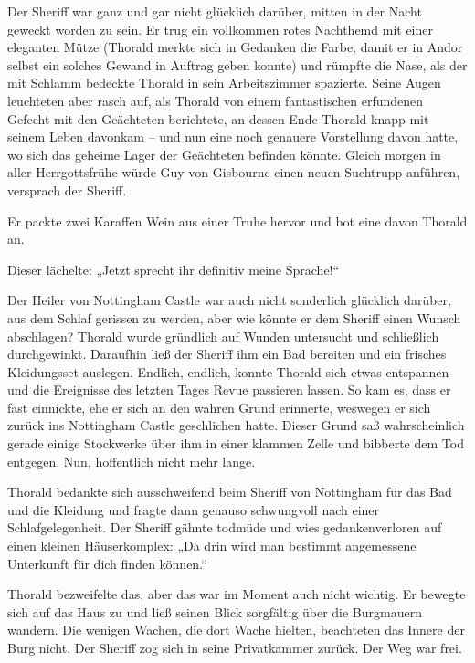 Der Sheriff war ganz und gar nicht glücklich darüber, mitten in der Nacht geweckt worden zu sein. Er trug ein vollkommen rotes Nachthemd mit einer eleganten Mütze (Thorald merkte sich in Gedanken die Farbe, damit er in Andor selbst ein solches Gewand in Auftrag geben konnte) und rümpfte die Nase, als der mit Schlamm bedeckte Thorald in sein Arbeitszimmer spazierte. Seine Augen leuchteten aber rasch auf, als Thorald von einem fantastischen erfundenen Gefecht mit den Geächteten berichtete, an dessen Ende Thorald knapp mit seinem Leben davonkam – und nun eine noch genauere Vorstellung davon hatte, wo sich das geheime Lager der Geächteten befinden könnte. Gleich morgen in aller Herrgottsfrühe würde Guy von Gisbourne einen neuen Suchtrupp anführen, versprach der Sheriff.

Er packte zwei Karaffen Wein aus einer Truhe hervor und bot eine davon Thorald an.

Dieser lächelte: „Jetzt sprecht ihr definitiv meine Sprache!“



\trennzeichen



Der Heiler von Nottingham Castle war auch nicht sonderlich glücklich darüber, aus dem Schlaf gerissen zu werden, aber wie könnte er dem Sheriff einen Wunsch abschlagen? Thorald wurde gründlich auf Wunden untersucht und schließlich durchgewinkt. Daraufhin ließ der Sheriff ihm ein Bad bereiten und ein frisches Kleidungsset auslegen. Endlich, endlich, konnte Thorald sich etwas entspannen und die Ereignisse des letzten Tages Revue passieren lassen. So kam es, dass er fast einnickte, ehe er sich an den wahren Grund erinnerte, weswegen er sich zurück ins Nottingham Castle geschlichen hatte. Dieser Grund saß wahrscheinlich gerade einige Stockwerke über ihm in einer klammen Zelle und bibberte dem Tod entgegen. Nun, hoffentlich nicht mehr lange.

Thorald bedankte sich ausschweifend beim Sheriff von Nottingham für das Bad und die Kleidung und fragte dann genauso schwungvoll nach einer Schlafgelegenheit. Der Sheriff gähnte todmüde und wies gedankenverloren auf einen kleinen Häuserkomplex: „Da drin wird man bestimmt angemessene Unterkunft für dich finden können.“

Thorald bezweifelte das, aber das war im Moment auch nicht wichtig. Er bewegte sich auf das Haus zu und ließ seinen Blick sorgfältig über die Burgmauern wandern. Die wenigen Wachen, die dort Wache hielten, beachteten das Innere der Burg nicht. Der Sheriff zog sich in seine Privatkammer zurück. Der Weg war frei.

